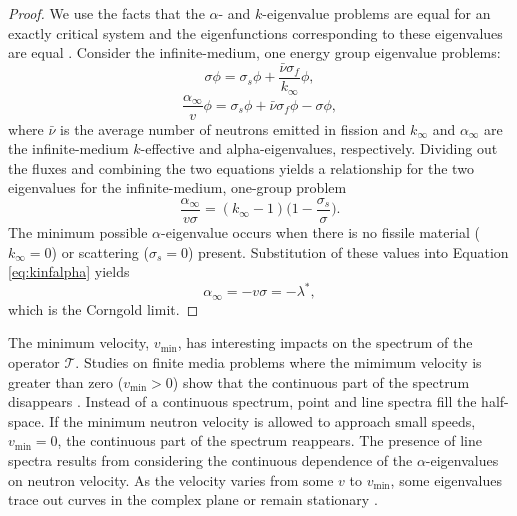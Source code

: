 \begin{proof}
	We use the facts that the $\alpha$- and $k$-eigenvalue problems are equal for an exactly critical system and the eigenfunctions corresponding to these eigenvalues are equal \cite{velarde_analysis_1978}. Consider the infinite-medium, one energy group eigenvalue problems:
	\begin{equation}
		\sigma \phi = \sigma_{s} \phi + \frac{\bar{\nu}\sigma_{f}}{k_{\infty}} \phi,
	\end{equation}
	\begin{equation}
		\frac{\alpha_{\infty}}{v}\phi = \sigma_{s} \phi + \bar{\nu}\sigma_{f}\phi - \sigma \phi,
	\end{equation}
where $\bar{\nu}$ is the average number of neutrons emitted in fission and $k_{\infty}$ and $\alpha_{\infty}$ are the infinite-medium $k$-effective and alpha-eigenvalues, respectively. Dividing out the fluxes and combining the two equations yields a relationship for the two eigenvalues for the infinite-medium, one-group problem \cite{kornreich_timeeigenvalue_2005}
\begin{equation}
	\frac{\alpha_{\infty}}{v\sigma} = (k_{\infty}-1) \bigg ( 1 - \frac{\sigma_{s}}{\sigma} \bigg ).
\label{eq:kinfalpha}
\end{equation}
The minimum possible $\alpha$-eigenvalue occurs when there is no fissile material ($k_{\infty} = 0$) or scattering ($\sigma_{s} = 0$) present. Substitution of these values into Equation \ref{eq:kinfalpha} yields
\begin{equation}
	\alpha_{\infty} = - v \sigma = -\lambda^{*},
\end{equation}
which is the Corngold limit.
\end{proof}

The minimum velocity, $v_{\text{min}}$, has interesting impacts on the spectrum of the operator $\mathcal{T}$. Studies on finite media problems where the mimimum velocity is greater than zero ($v_{\text{min}} > 0$) show that the continuous part of the spectrum disappears \cite{jorgens_asymptotic_1958}. Instead of a continuous spectrum, point and line spectra fill the half-space. If the minimum neutron velocity is allowed to approach small speeds, $v_{\text{min}} = 0$, the continuous part of the spectrum reappears. The presence of line spectra results from considering the continuous dependence of the $\alpha$-eigenvalues on neutron velocity. As the velocity varies from some $v$ to $v_{\text{min}}$, some eigenvalues trace out curves in the complex plane or remain stationary \cite{larsen_spectrum_1974}.

